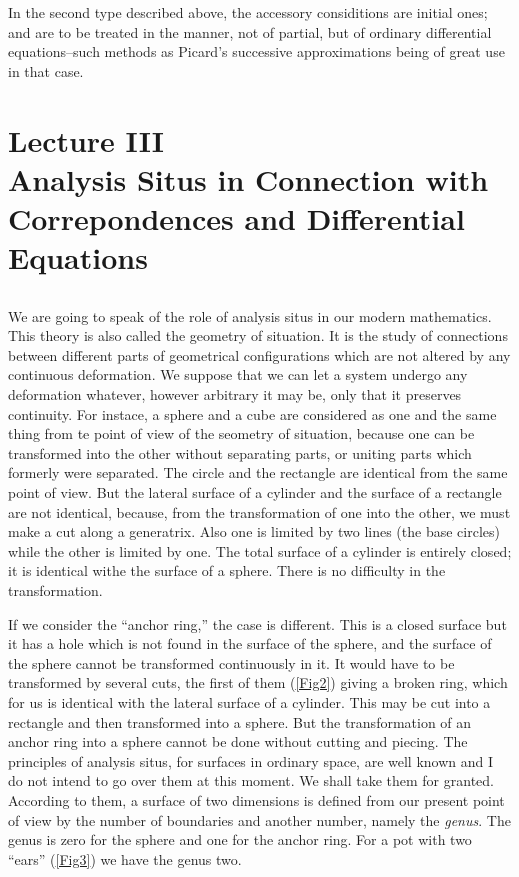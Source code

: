 \documentclass[12pt,oneside]{book}
\begin{document}
In the second type described above, the accessory considitions are initial ones; and are to be treated in the manner, not of partial, but of ordinary differential equations--such methods as Picard's successive approximations being of great use in that case. \par

\chapter[Lecture III]{Lecture III\\Analysis Situs in Connection with\\Correpondences and Differential Equations}
\section{}
We are going to speak of the role of analysis situs in our modern mathematics. This theory is also called the geometry of situation. It is the study of connections between different parts of geometrical configurations which are not altered by any continuous deformation. We suppose that we can let a system undergo any deformation whatever, however arbitrary it may be, only that it preserves continuity. For instace, a sphere and a cube are considered as one and the same thing from te point of view of the seometry of situation, because one can be transformed into the other without separating parts, or uniting parts which formerly were separated. The circle and the rectangle are identical from the same point of view. But the lateral surface of a cylinder and the surface of a rectangle are not identical, because, from the transformation of one into the other, we must make a cut along a generatrix. Also one is limited by two lines (the base circles) while the other is limited by one. The total surface of a cylinder is entirely closed; it is identical withe the surface of a sphere. There is no difficulty in the transformation. \par

If we consider the ``anchor ring,'' the case is different. This is a closed surface but it has a hole which is not found in the surface of the sphere, and the surface of the sphere cannot be transformed continuously in it. It would have to be transformed by several cuts, the first of them (\ref{Fig2}) giving a broken ring, which for us is identical with the lateral surface of a cylinder. This may be cut into a rectangle and then transformed into a sphere. But the transformation of an anchor ring into a sphere cannot be done without cutting and piecing. The principles of analysis situs, for surfaces in ordinary space, are well known and I do not intend to go over them at this moment. We shall take them for granted. According to them, a surface of two dimensions is defined from our present point of view by the number of boundaries and another number, namely the \textit{genus}. The genus is zero for the sphere and one for the anchor ring. For a pot with two ``ears'' (\ref{Fig3}) we have the genus two. \par
\end{document}
